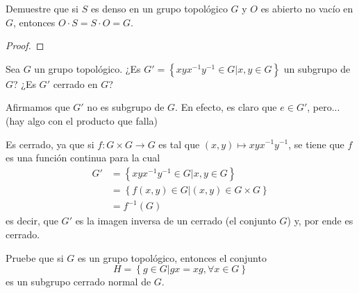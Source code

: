 \documentclass[12pt]{report}
\theoremstyle{largebreak}
\newcommand{\cf}[3]{\ensuremath{#1:#2\rightarrow#3}}
\begin{document}
    \begin{excer}
        Demuestre que si $S$ es denso en un grupo topológico $G$ y $O$ es abierto no vacío en $G$, entonces $O\cdot S=S\cdot O= G$.
    \end{excer}

    \begin{proof}
        
    \end{proof}

    
    \begin{excer}
        Sea $G$ un grupo topológico. ¿Es $G'=\left\{xyx^{-1}y^{-1}\in G\Big|x,y\in G \right\}$ un subgrupo de $G$? ¿Es $G'$ cerrado en $G$?
    \end{excer}

    \begin{sol}
        Afirmamos que $G'$ no es subgrupo de $G$. En efecto, es claro que $e\in G'$, pero... (hay algo con el producto que falla)

        Es cerrado, ya que si $\cf{f}{G\times G}{G}$ es tal que $(x,y)\mapsto xyx^{-1}y^{-1}$, se tiene que $f$ es una función continua para la cual
        \begin{equation*}
            \begin{split}
                G'&=\left\{xyx^{-1}y^{-1}\in G\Big|x,y\in G \right\}\\
                &=\left\{f(x,y)\in G\Big|(x,y)\in G\times G \right\}\\
                &=f^{-1}(G)
            \end{split}
        \end{equation*}
        es decir, que $G'$ es la imagen inversa de un cerrado (el conjunto $G$) y, por ende es cerrado.
    \end{sol}

    \begin{excer}
        Pruebe que si $G$ es un grupo topológico, entonces el conjunto
        \begin{equation*}
            H=\left\{g\in G\Big|gx=xg,\forall x\in G \right\}
        \end{equation*}
        es un subgrupo cerrado normal de $G$.
    \end{excer}
\end{document}
